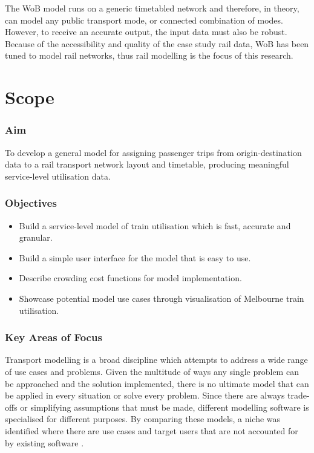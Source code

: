 The WoB model runs on a generic timetabled network and therefore, in theory, can model any public transport mode, or connected combination of modes. However, to receive an accurate output, the input data must also be robust. Because of the accessibility and quality of the case study rail data, WoB has been tuned to model rail networks, thus rail modelling is the focus of this research. 

\section{Scope}
\subsubsection{Aim}
To develop a general model for assigning passenger trips from origin-destination data to a rail transport network layout and timetable, producing meaningful service-level utilisation data. 

\subsubsection{Objectives}
\begin{SingleSpacing}
\begin{itemize}
    \item Build a service-level model of train utilisation which is fast, accurate and granular. 
    \item Build a simple user interface for the model that is easy to use. 
    \item Describe crowding cost functions for model implementation. 
    \item Showcase potential model use cases through visualisation of Melbourne train utilisation. 
\end{itemize}
\end{SingleSpacing}

\subsubsection{Key Areas of Focus}
Transport modelling is a broad discipline which attempts to address a wide range of use cases and problems. Given the multitude of ways any single problem can be approached and the solution implemented, there is no ultimate model that can be applied in every situation or solve every problem. Since there are always trade-offs or simplifying assumptions that must be made, different modelling software is specialised for different purposes. By comparing these models, a niche was identified where there are use cases and target users that are not accounted for by existing software \cite{horniMultiAgentTransportSimulation2016, adnanAgentbasedSimulationPlatforma, ZenithMultimodalTransport}. 


